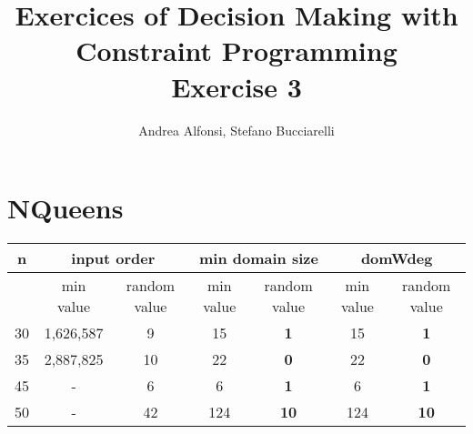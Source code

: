 \documentclass{article}
\title{Exercices of Decision Making with Constraint Programming\\  Exercise 3}
\author{Andrea Alfonsi, Stefano Bucciarelli}
\begin{document}
    \maketitle
    \section{NQueens}
    \begin{tabular}{||c | c | c | c | c | c |  c||} 
    \hline
      n & \multicolumn{2}{c|}{input order} & \multicolumn{2}{c|}{min domain size} &  \multicolumn{2}{c||}{domWdeg} \\  \hline
      & min value & random value & min value & random value & min value & random value  \\  \hline
      30 & 1,626,587 & 9 & 15 & \textbf{1} & 15 & \textbf{1}  \\  \hline
      35 & 2,887,825 & 10 & 22 & \textbf{0} & 22 & \textbf{0}  \\  \hline
      45 & - & 6 & 6 & \textbf{1} & 6 & \textbf{1} \\  \hline
      50 & - & 42 & 124 & \textbf{10} & 124 & \textbf{10}  \\  \hline
    \end{tabular}
    \\ \\
\end{document}
